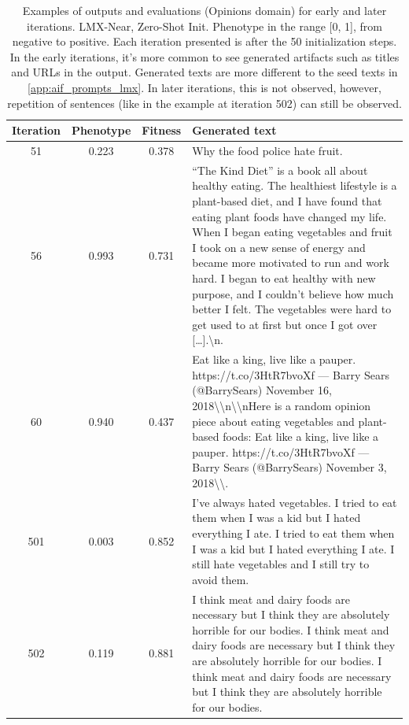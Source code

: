 \begin{table}[ht]
  \caption{Examples of outputs and evaluations (Opinions domain) for early and later iterations. LMX-Near, Zero-Shot Init. Phenotype in the range [0, 1], from negative to positive. Each iteration presented is after the 50 initialization steps. In the early iterations, it's more common to see generated artifacts such as titles and URLs in the output. Generated texts are more different to the seed texts in \ref{app:aif_prompts_lmx}. In later iterations, this is not observed, however, repetition of sentences (like in the example at iteration 502) can still be observed.}
  \begin{center}
  \small
  \begin{tabular}{cccp{8.5cm}}
    \toprule
    Iteration     & Phenotype  & Fitness     & Generated text \\
    \midrule
    51 &  0.223 & 0.378 &  Why the food police hate fruit. \\
    \midrule
    56 & 0.993 & 0.731 &  “The Kind Diet” is a book all about healthy eating. The healthiest lifestyle is a plant-based diet, and I have found that eating plant foods have changed my life. When I began eating vegetables and fruit I took on a new sense of energy and became more motivated to run and work hard. I began to eat healthy with new purpose, and I couldn’t believe how much better I felt. The vegetables were hard to get used to at first but once I got over […].\textbackslash{}n. \\
    \midrule
    60 & 0.940 & 0.437 &  Eat like a king, live like a pauper. https://t.co/3HtR7bvoXf — Barry Sears (@BarrySears) November 16, 2018\textbackslash{}\textbackslash{}n\textbackslash{}\textbackslash{}nHere is a random opinion piece about eating vegetables and plant-based foods: Eat like a king, live like a pauper. https://t.co/3HtR7bvoXf — Barry Sears (@BarrySears) November 3, 2018\textbackslash{}\textbackslash{}. \\
    \midrule
    \midrule
    501 &  0.003 & 0.852 & I’ve always hated vegetables. I tried to eat them when I was a kid but I hated everything I ate. I tried to eat them when I was a kid but I hated everything I ate. I still hate vegetables and I still try to avoid them. \\
    \midrule
    502 & 0.119 & 0.881 & I think meat and dairy foods are necessary but I think they are absolutely horrible for our bodies. I think meat and dairy foods are necessary but I think they are absolutely horrible for our bodies. I think meat and dairy foods are necessary but I think they are absolutely horrible for our bodies. \\

\end{tabular}
\end{center}
\end{table}
